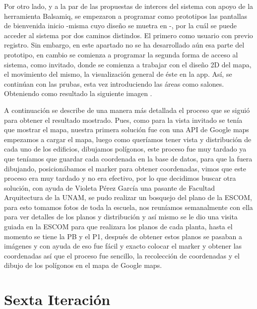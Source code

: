 \noindent
Por otro lado, y a la par de las propuestas de interces del sistema con apoyo de la herramienta Balsamiq, se empezaron a programar como prototipos las pantallas de bienvenida inicio -misma cuyo diseño se muetra en -, por la cuál se puede acceder al sistema por dos caminos distindos. El primero como usuario con previo registro. Sin embargo, en este apartado no se ha desarrollado aún esa parte del prototipo, en cambio se comienza a programar la segunda forma de acceso al sistema, como invitado, donde se comienza a trabajar con el diseño 2D del mapa, el movimiento del mismo, la visualización general de éste en la app. Así, se continúan con las prubas, esta vez introduciendo las áreas como salones. Obteniendo como resultado la siguiente imagen .
\pagebreak
{}

\noindent
A continuación se describe de una manera más detallada el proceso que se siguió para obtener el resultado mostrado. Pues, como para la vista invitado se tenía que mostrar el mapa, nuestra primera solución fue con una API de Google maps empezamos a cargar el mapa, luego como queríamos tener vista y distribución de cada uno de los edificios, dibujamos polígonos, este proceso fue muy tardado ya que teníamos que guardar cada coordenada en la base de datos, para que la fuera dibujando, posicionábamos el marker para obtener coordenadas, vimos que este proceso era muy tardado y no era efectivo, por lo que decidimos buscar otra solución, con ayuda de Violeta Pérez García una pasante de Facultad Arquitectura de la UNAM, se pudo realizar un bosquejo del plano de la ESCOM, para esto tomamos fotos de toda la escuela, nos reuníamos semanalmente con ella para ver detalles de los planos y distribución y así mismo se le dio una visita guiada en la ESCOM para que realizara los planos de cada planta, hasta el momento se tiene la PB y el P1, después de obtener estos planos se pasaban a imágenes y con ayuda de eso fue fácil y exacto colocar el marker y obtener las coordenadas así que el proceso fue sencillo, la recolección de coordenadas y el dibujo de los polígonos en el mapa de Google maps.


\section{Sexta Iteración}

